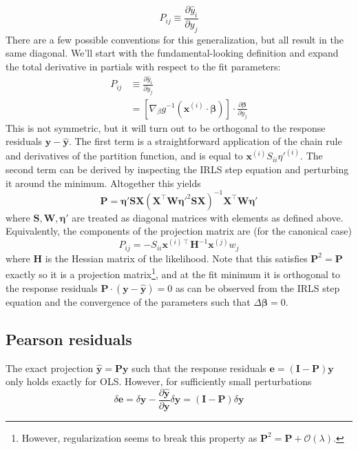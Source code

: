 \documentclass{article}
\newcommand{\bbeta}{\boldsymbol{\beta}}
\begin{document}
\[ P_{ij} \equiv \frac{\partial \hat{y}_i}{\partial y_j} \]
There are a few possible conventions for this generalization, but all result in
the same diagonal. We'll start with the fundamental-looking definition and
expand the total derivative in partials with respect to the fit parameters:
\begin{align}
P_{ij} &\equiv \frac{\partial \hat{y}_i}{\partial y_j} \\
&= \left[\nabla_\beta g^{-1}\left(\mathbf{x}^{(i)}\cdot\bbeta\right)\right] \cdot \frac{\partial \bbeta}{\partial y_j}
\end{align}
This is not symmetric, but it will turn out to be orthogonal to the response
residuals \(\mathbf{y} - \hat{\mathbf{y}}\). The first term is a
straightforward application of the chain rule and derivatives of the partition
function, and is equal to
\(\mathbf{x}^{(i)}S_{ii}\eta'^{(i)}\). The
second term can be derived by inspecting the IRLS step
equation and perturbing it around the minimum. Altogether this yields
\[ \mathbf{P} = \boldsymbol{\eta}' \mathbf{S} \mathbf{X} \left(\mathbf{X}^\intercal \mathbf{W} \boldsymbol{\eta}'^{2} \mathbf{S} \mathbf{X}\right)^{-1} \mathbf{X}^\intercal \mathbf{W} \boldsymbol{\eta}' \]
where \(\mathbf{S}, \mathbf{W}, \boldsymbol{\eta}'\) are treated as diagonal
matrices with elements as defined above.
Equivalently, the components of the projection matrix are (for the canonical case)
\[ P_{ij} = -S_{ii} \mathbf{x}^{(i)\intercal}\mathbf{H}^{-1}\mathbf{x}^{(j)} w_{j} \]
where \(\mathbf{H}\) is the Hessian matrix of the likelihood.
Note that this satisfies
\(\mathbf{P}^2 = \mathbf{P}\) exactly so it is a projection
matrix\footnote{However, regularization seems to break this property as
\(\mathbf{P}^2 = \mathbf{P} + \mathcal{O}(\lambda)\).}, and at
the fit minimum it is orthogonal to the response residuals
\(\mathbf{P}\cdot\left(\mathbf{y} - \hat{\mathbf{y}}\right) = 0\) as can be
observed from the IRLS step equation and the convergence of the parameters such
that \(\Delta \bbeta = 0\).

\subsection{Pearson residuals}

The exact projection \(\hat{\mathbf{y}} = \mathbf{P y}\) such that the response
residuals \(\mathbf{e} = (\mathbf{I} - \mathbf{P})\mathbf{y} \) only holds
exactly for OLS. However, for sufficiently small perturbations
\[ \delta \mathbf{e} = \delta\mathbf{y} - \frac{\partial \hat{\mathbf{y}}}{\partial \mathbf{y}} \delta \mathbf{y} = (\mathbf{I} - \mathbf{P}) \delta \mathbf{y} \]
\end{document}
